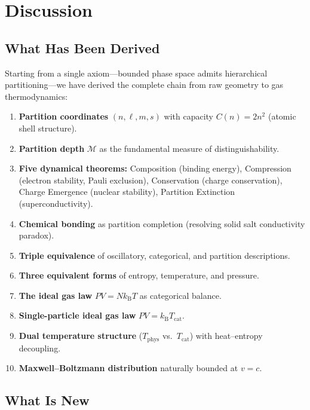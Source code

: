 \documentclass[twocolumn,10pt,a4paper]{article}
\theoremstyle{plain}
\theoremstyle{definition}
\theoremstyle{remark}
\newcommand{\kB}{k_{\mathrm{B}}}
\newcommand{\Depth}{\mathcal{M}}
\begin{document}
\section{Discussion}
\label{sec:discussion}

\subsection{What Has Been Derived}

Starting from a single axiom---bounded phase space admits hierarchical partitioning---we have derived the complete chain from raw geometry to gas thermodynamics:

\begin{enumerate}
    \item \textbf{Partition coordinates} $(n, \ell, m, s)$ with capacity $C(n) = 2n^2$ (atomic shell structure).
    \item \textbf{Partition depth} $\Depth$ as the fundamental measure of distinguishability.
    \item \textbf{Five dynamical theorems:} Composition (binding energy), Compression (electron stability, Pauli exclusion), Conservation (charge conservation), Charge Emergence (nuclear stability), Partition Extinction (superconductivity).
    \item \textbf{Chemical bonding} as partition completion (resolving solid salt conductivity paradox).
    \item \textbf{Triple equivalence} of oscillatory, categorical, and partition descriptions.
    \item \textbf{Three equivalent forms} of entropy, temperature, and pressure.
    \item \textbf{The ideal gas law} $PV = N\kB T$ as categorical balance.
    \item \textbf{Single-particle ideal gas law} $PV = \kB T_{\mathrm{cat}}$.
    \item \textbf{Dual temperature structure} ($T_{\mathrm{phys}}$ vs.\ $T_{\mathrm{cat}}$) with heat--entropy decoupling.
    \item \textbf{Maxwell--Boltzmann distribution} naturally bounded at $v = c$.
\end{enumerate}

\subsection{What Is New}
\end{document}
